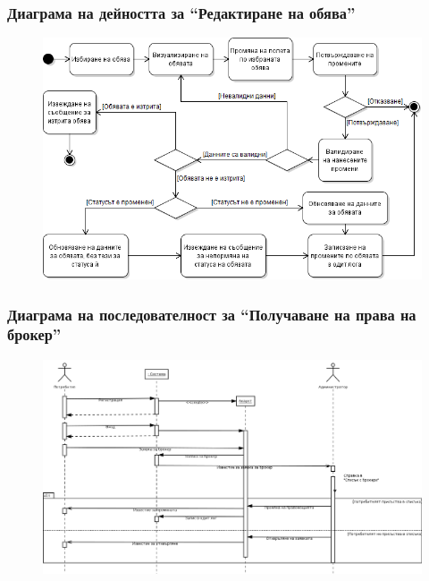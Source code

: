 \documentclass[12pt]{beamer}
\begin{document}
\begin{frame}[fragile]
\frametitle{Диаграма на дейността за ``Редактиране на обява''}
        \begin{figure}[h]
        \centering
		\includegraphics[scale=0.4,keepaspectratio=true]{uml3}
        \end{figure}
\end{frame}

\begin{frame}[fragile]
\frametitle{Диаграма на последователност за ``Получаване на права на брокер''}
        \begin{figure}[h]
        \centering
		\includegraphics[scale=0.2,keepaspectratio=true]{uml04}
        \end{figure}
\end{frame}
\end{document}
